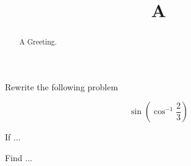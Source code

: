 \documentclass{ximera}
\title[A]{A}
\begin{document}
\begin{abstract}
A Greeting.
\end{abstract}

\maketitle

Rewrite the following problem

\[ \sin \left (\cos^{-1}  \frac{2}{3} \right)\]

If ...



Find ...
\end{document}
